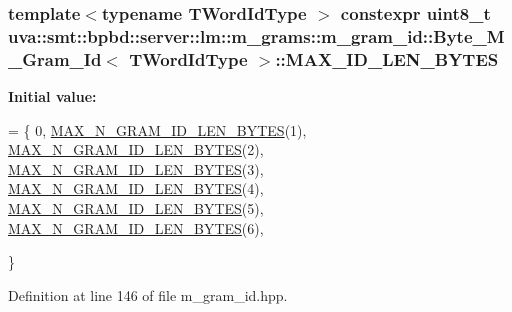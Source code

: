 \subsubsection[{M\+A\+X\+\_\+\+I\+D\+\_\+\+L\+E\+N\+\_\+\+B\+Y\+T\+E\+S}]{\setlength{\rightskip}{0pt plus 5cm}template$<$typename T\+Word\+Id\+Type $>$ constexpr uint8\+\_\+t {\bf uva\+::smt\+::bpbd\+::server\+::lm\+::m\+\_\+grams\+::m\+\_\+gram\+\_\+id\+::\+Byte\+\_\+\+M\+\_\+\+Gram\+\_\+\+Id}$<$ T\+Word\+Id\+Type $>$\+::M\+A\+X\+\_\+\+I\+D\+\_\+\+L\+E\+N\+\_\+\+B\+Y\+T\+E\+S\hspace{0.3cm}{\ttfamily [static]}}\label{classuva_1_1smt_1_1bpbd_1_1server_1_1lm_1_1m__grams_1_1m__gram__id_1_1_byte___m___gram___id_a362678edc27ef4ef3b78d0b747e0466c}
{\bfseries Initial value\+:}
\begin{DoxyCode}
= \{
                                    0,
                                    \hyperlink{m__gram__id_8hpp_a5a110b6715dcc27ba7f3429fedc1496f}{MAX\_N\_GRAM\_ID\_LEN\_BYTES}(1),
                                    \hyperlink{m__gram__id_8hpp_a5a110b6715dcc27ba7f3429fedc1496f}{MAX\_N\_GRAM\_ID\_LEN\_BYTES}(2),
                                    \hyperlink{m__gram__id_8hpp_a5a110b6715dcc27ba7f3429fedc1496f}{MAX\_N\_GRAM\_ID\_LEN\_BYTES}(3),
                                    \hyperlink{m__gram__id_8hpp_a5a110b6715dcc27ba7f3429fedc1496f}{MAX\_N\_GRAM\_ID\_LEN\_BYTES}(4),
                                    \hyperlink{m__gram__id_8hpp_a5a110b6715dcc27ba7f3429fedc1496f}{MAX\_N\_GRAM\_ID\_LEN\_BYTES}(5),
                                    \hyperlink{m__gram__id_8hpp_a5a110b6715dcc27ba7f3429fedc1496f}{MAX\_N\_GRAM\_ID\_LEN\_BYTES}(6),

                                \}
\end{DoxyCode}


Definition at line 146 of file m\+\_\+gram\+\_\+id.\+hpp.

\hypertarget{classuva_1_1smt_1_1bpbd_1_1server_1_1lm_1_1m__grams_1_1m__gram__id_1_1_byte___m___gram___id_abfb2441a9e2b433ef183d2f979979122}{}
